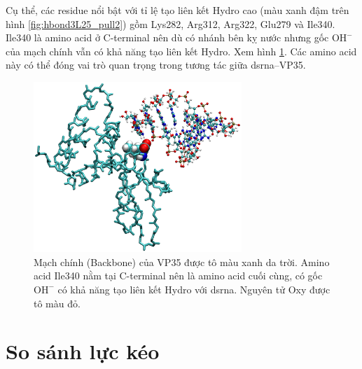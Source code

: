 \documentclass[12pt,a4paper,reqno, oneside]{book}
\begin{document}
Cụ thể, các \gls{residue} nổi bật với tỉ lệ tạo liên kết Hydro cao (màu xanh đậm trên hình \ref{fig:hbond3L25_pull2}) gồm Lys282, Arg312, Arg322, Glu279 và Ile340. Ile340 là amino acid ở C-terminal nên dù có nhánh bên kỵ nước nhưng gốc $\text{OH}^{-}$ của mạch chính vẫn có khả năng tạo liên kết Hydro. Xem hình \ref{fig:Ile340}. Các amino acid này có thể đóng vai trò quan trọng trong tương tác giữa \gls{dsrna}--VP35.
\begin{figure}[h]
\centering
\includegraphics[width=0.7\textwidth,natwidth=610,natheight=642]{ILE340}
\caption{Mạch chính (Backbone) của VP35 được tô màu xanh da trời. Amino acid Ile340 nằm tại C-terminal nên là amino acid cuối cùng, có gốc $\text{OH}^{-}$ có khả năng tạo liên kết Hydro với \gls{dsrna}. Nguyên tử Oxy được tô màu đỏ.}
\label{fig:Ile340}
\end{figure}

\section{So sánh lực kéo}
\end{document}
